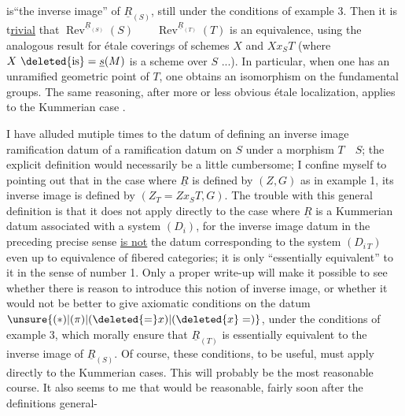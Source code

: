 
is``the inverse image'' of $\underline{R}_{(S)}$, still under the conditions of example 3. Then it is t\uline{rivial} that $\operatorname{Rev}^{\underline{R}_{(S)}}(S)\qquad\operatorname{Rev}^{\underline{R}_{(T)}}(T)$ is an equivalence, using the analogous result for étale coverings of schemes $X$ and $Xx_{S}T$ (where $X\ \deleted{\mathrm{is}}=\underline{s}(M)$ is a scheme  over $S$ ...). In particular, when one has an unramified geometric point of $T$, one obtains an isomorphism on the fundamental groups. The same reasoning, after more or less obvious étale localization, applies to the Kummerian case .

I have alluded mutiple times to the datum of defining an inverse image ramification datum of a ramification datum on $S$ under a morphism $T\quad S$; the explicit definition would necessarily be a little cumbersome; I confine myself to pointing out that in the case where $\underline{R}$ is defined by $(Z,G)$ as in example 1, its inverse image is defined by $(Z_T=Zx_ST,G)$. The trouble with this general definition is that it does not apply directly to the case where $\underline{R}$ is a Kummerian datum associated with a system $(D_i)$, for the inverse image datum in the preceding precise sense \uline{is not} the datum corresponding to the system $(D_{i\,T})$ even up to equivalence of fibered categories; it is only ``essentially equivalent'' to it in the sense of number 1. Only a proper write-up will make it possible to see whether there is reason to introduce this notion of inverse image, or whether it would not be better to give axiomatic conditions on the datum $\unsure{(*)|(\pi)|(\deleted{=}x)|(\deleted{x}=)}$, under the conditions of example 3, which morally ensure that $\underline{R}_{(T)}$ is essentially equivalent to the inverse image of $\underline{R}_{(S)}$. Of course, these conditions, to  be useful, must apply directly to the Kummerian cases. This will probably be the most reasonable course. It also seems to me that would be reasonable, fairly soon after the definitions general-
